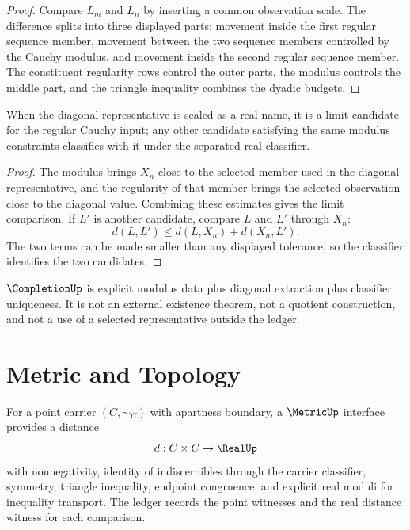 \begin{proof}
Compare $L_m$ and $L_n$ by inserting a common observation scale.  The
difference splits into three displayed parts: movement inside the first
regular sequence member, movement between the two sequence members controlled
by the Cauchy modulus, and movement inside the second regular sequence
member.  The constituent regularity rows control the outer parts, the modulus
controls the middle part, and the triangle inequality combines the dyadic
budgets.
\end{proof}

\begin{theorem}
\label{thm:countable-completion-limit-uniqueness}
When the diagonal representative is sealed as a real name, it is a limit
candidate for the regular Cauchy input; any other candidate satisfying the
same modulus constraints classifies with it under the separated real
classifier.
\end{theorem}

\begin{proof}
The modulus brings $X_n$ close to the selected member used in the diagonal
representative, and the regularity of that member brings the selected
observation close to the diagonal value.  Combining these estimates gives the
limit comparison.  If $L'$ is another candidate, compare $L$ and $L'$ through
$X_n$:
$$
d(L,L')\le d(L,X_n)+d(X_n,L').
$$
The two terms can be made smaller than any displayed tolerance, so the
classifier identifies the two candidates.
\end{proof}

\begin{principle}
\label{prin:countable-completion-boundary}
$\CompletionUp$ is explicit modulus data plus diagonal extraction plus
classifier uniqueness.  It is not an external existence theorem, not a
quotient construction, and not a use of a selected representative outside
the ledger.
\end{principle}

\section{Metric and Topology}
\label{sec:countable-completion-metric-topology}

\begin{definition}
\label{def:countable-completion-metric-interface}
For a point carrier $(C,\sim_C)$ with apartness boundary, a $\MetricUp$
interface provides a distance
$$
d:C\times C\to\RealUp
$$
with nonnegativity, identity of indiscernibles through the carrier
classifier, symmetry, triangle inequality, endpoint congruence, and explicit
real moduli for inequality transport.  The ledger records the point
witnesses and the real distance witness for each comparison.
\end{definition}

